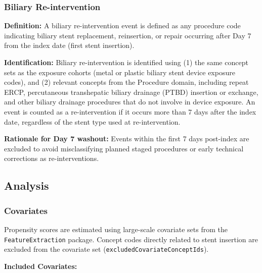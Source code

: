\documentclass[
  12pt,
]{article}
\begin{document}
\subsubsection{Biliary Re-intervention}\label{biliary-re-intervention}

\textbf{Definition:} A biliary re-intervention event is defined as any procedure code indicating biliary stent replacement, reinsertion, or repair occurring after Day 7 from the index date (first stent insertion).

\textbf{Identification:} Biliary re-intervention is identified using (1) the same concept sets as the exposure cohorts (metal or plastic biliary stent device exposure codes), and (2) relevant concepts from the Procedure domain, including repeat ERCP, percutaneous transhepatic biliary drainage (PTBD) insertion or exchange, and other biliary drainage procedures that do not involve in device exposure. An event is counted as a re-intervention if it occurs more than 7 days after the index date, regardless of the stent type used at re-intervention.

\textbf{Rationale for Day 7 washout:} Events within the first 7 days post-index are excluded to avoid misclassifying planned staged procedures or early technical corrections as re-interventions.

\subsection{Analysis}\label{analysis}

\subsubsection{Covariates}\label{covariates}

Propensity scores are estimated using large-scale covariate sets from the \texttt{FeatureExtraction} package. Concept codes directly related to stent insertion are excluded from the covariate set (\texttt{excludedCovariateConceptIds}).

\textbf{Included Covariates:}
\end{document}
